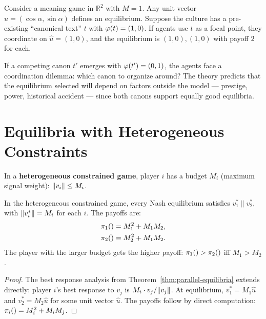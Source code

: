 \begin{example}
\label{ex:focal}
Consider a meaning game in $\mathbb{R}^2$ with $M = 1$. Any unit vector
$\hat{u} = (\cos\alpha, \sin\alpha)$ defines an equilibrium. Suppose the
culture has a pre-existing ``canonical text'' $t$ with $\varphi(t) = (1, 0)$.
If agents use $t$ as a focal point, they coordinate on $\hat{u} = (1, 0)$,
and the equilibrium is $(1, 0), (1, 0)$ with payoff $2$ for each.

If a competing canon $t'$ emerges with $\varphi(t') = (0, 1)$, the agents face
a coordination dilemma: which canon to organize around? The theory predicts
that the equilibrium selected will depend on factors outside the model ---
prestige, power, historical accident --- since both canons support equally
good equilibria.
\end{example}


\section{Equilibria with Heterogeneous Constraints}

\begin{definition}
\label{def:hetero-game}
In a \textbf{heterogeneous constrained game}, player $i$ has a budget
$M_i$ (maximum signal weight): $\lVert v_i \rVert \leq M_i$.
\end{definition}

\begin{theorem}
\label{thm:hetero-ne}
In the heterogeneous constrained game, every Nash equilibrium satisfies
$v_1^* \parallel v_2^*$, with $\lVert v_i^* \rVert = M_i$ for each $i$. The
payoffs are:
\begin{align*}
  \pi_{1}() &= M_1^2 + M_1 M_2, \\
  \pi_{2}() &= M_2^2 + M_1 M_2.
\end{align*}
The player with the larger budget gets the higher payoff: $\pi_{1}() >
\pi_{2}()$ iff $M_1 > M_2$.
\end{theorem}

\begin{proof}
The best response analysis from Theorem~\ref{thm:parallel-equilibria} extends
directly: player $i$'s best response to $v_j$ is $M_i \cdot v_j / \lVert v_j \rVert$.
At equilibrium, $v_1^* = M_1 \hat{u}$ and $v_2^* = M_2 \hat{u}$ for some
unit vector $\hat{u}$. The payoffs follow by direct computation:
$\pi_{i}() = M_i^2 + M_i M_j$.
\end{proof}

